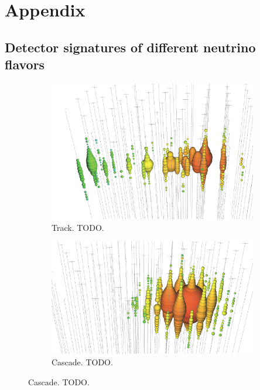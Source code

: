 \chapter{Appendix}
\blindtext

\section{Detector signatures of different neutrino flavors}
\begin{figure}
  \centering
  \begin{subfigure}{0.3\textwidth}
    \centering
    \includegraphics[width=\textwidth]{content/img/signatures/track.png}
    \caption{
        Track. TODO.
    }
  \end{subfigure}
  \begin{subfigure}{0.3\textwidth}
    \centering
    \includegraphics[width=\textwidth]{content/img/signatures/cascade.png}
    \caption{
        Cascade. TODO.
    }
  \end{subfigure}

\end{figure}
